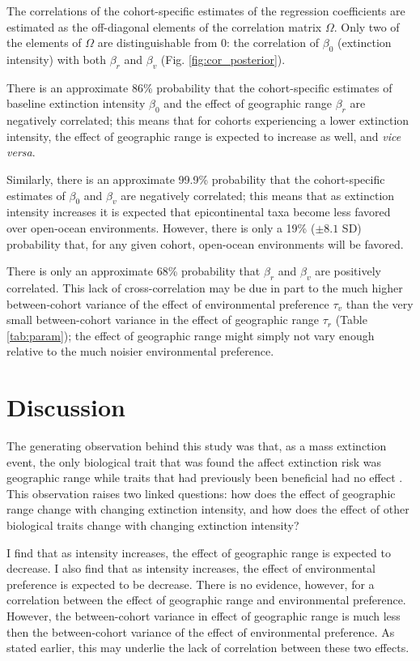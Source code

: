 \documentclass{article}
\begin{document}
The correlations of the cohort-specific estimates of the regression coefficients are estimated as the off-diagonal elements of the correlation matrix \(\Omega\). Only two of the elements of \(\Omega\) are distinguishable from 0: the correlation of \(\beta_{0}\) (extinction intensity) with both \(\beta_{r}\) and \(\beta_{v}\) (Fig. \ref{fig:cor_posterior}). 

There is an approximate 86\% probability that the cohort-specific estimates of baseline extinction intensity \(\beta_{0}\) and the effect of geographic range \(\beta_{r}\) are negatively correlated; this means that for cohorts experiencing a lower extinction intensity, the effect of geographic range is expected to increase as well, and \textit{vice versa}. 

Similarly, there is an approximate 99.9\% probability that the cohort-specific estimates of \(\beta_{0}\) and \(\beta_{v}\) are negatively correlated; this means that as extinction intensity increases it is expected that epicontinental taxa become less favored over open-ocean environments. However, there is only a 19\% (\(\pm 8.1\) SD) probability that, for any given cohort, open-ocean environments will be favored.

There is only an approximate 68\% probability that \(\beta_{r}\) and \(\beta_{v}\) are positively correlated. This lack of cross-correlation may be due in part to the much higher between-cohort variance of the effect of environmental preference \(\tau_{v}\) than the very small between-cohort variance in the effect of geographic range \(\tau_{r}\) (Table \ref{tab:param}); the effect of geographic range might simply not vary enough relative to the much noisier environmental preference. 


\section{Discussion}

The generating observation behind this study was that, as a mass extinction event, the only biological trait that was found the affect extinction risk was geographic range while traits that had previously been beneficial had no effect \citep{Jablonski1986}. This observation raises two linked questions: how does the effect of geographic range change with changing extinction intensity, and how does the effect of other biological traits change with changing extinction intensity?

I find that as intensity increases, the effect of geographic range is expected to decrease. I also find that as intensity increases, the effect of environmental preference is expected to be decrease. There is no evidence, however, for a correlation between the effect of geographic range and environmental preference. However, the between-cohort variance in effect of geographic range is much less then the between-cohort variance of the effect of environmental preference. As stated earlier, this may underlie the lack of correlation between these two effects.
\end{document}
